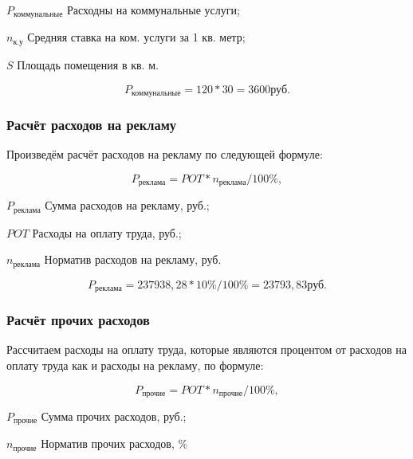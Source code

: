 \begin{eqexpl}[12ex]
    \item{$P_\text{коммунальные}$} Расходны на коммунальные услуги;
    \item{$n_\text{к.у}$} Средняя ставка на ком. услуги за 1 кв. метр;
    \item{$S$} Площадь помещения в кв. м.
\end{eqexpl}

\begin{equation*}
    P_\text{коммунальные} = 120 * 30 = 3600 \text{руб}.
\end{equation*}

\subsubsection{Расчёт расходов на рекламу}

Произведём расчёт расходов на рекламу по следующей формуле:

\begin{equation}
    P_\text{реклама} = POT * n_\text{реклама} / 100\%,
\end{equation}

\begin{eqexpl}[7ex]
    \item{$P_\text{реклама}$} Сумма расходов на рекламу, руб.;
    \item{$POT$} Расходы на оплату труда, руб.;
    \item{$n_\text{реклама}$} Норматив расходов на рекламу, руб.
\end{eqexpl}

\begin{equation*}
    P_\text{реклама} = 237938,28 * 10\% / 100\% = 23793,83 \text{руб}.
\end{equation*}

\subsubsection{Расчёт прочих расходов}

Рассчитаем расходы на оплату труда, которые являются процентом от расходов
на оплату труда как и расходы на рекламу, по формуле:

\begin{equation}
    P_\text{прочие} = POT * n_\text{прочие} / 100\%,
\end{equation}

\begin{eqexpl}[6ex]
    \item{$P_\text{прочие}$} Сумма прочих расходов, руб.;
    \item{$n_\text{прочие}$} Норматив прочих расходов, \%
\end{eqexpl}

